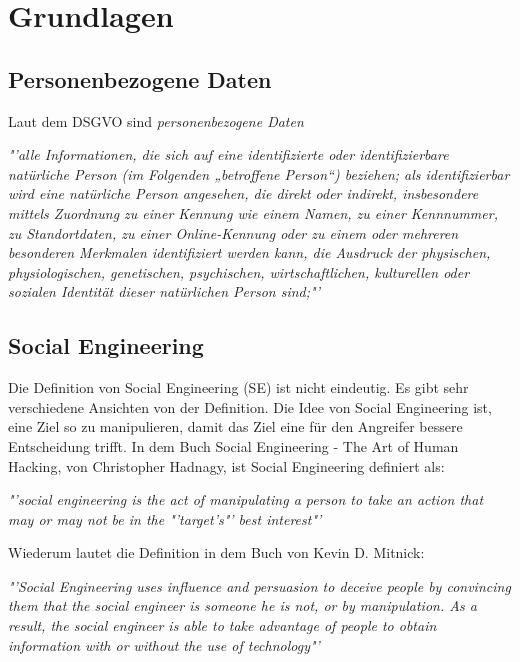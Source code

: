 
\chapter {Grundlagen}  %
\label{cha:grundlagen} %

\section{Personenbezogene Daten}
Laut dem DSGVO sind \textit{personenbezogene Daten} 

\textit{"'alle Informationen, die sich auf eine identifizierte oder identifizierbare natürliche Person (im Folgenden „betroffene Person“) beziehen; als identifizierbar wird eine natürliche Person angesehen, die direkt oder indirekt, insbesondere mittels Zuordnung zu einer Kennung wie einem Namen, zu einer Kennnummer, zu Standortdaten, zu einer Online-Kennung oder zu einem oder mehreren besonderen Merkmalen identifiziert werden kann, die Ausdruck der physischen, physiologischen, genetischen, psychischen, wirtschaftlichen, kulturellen oder sozialen Identität dieser natürlichen Person sind;"'}\cite{personenbezogeneDaten}

\section{Social Engineering} %
\label {sec:Social Engineering} %
	Die Definition von Social Engineering (SE) ist nicht eindeutig. Es gibt sehr verschiedene Ansichten von der Definition. Die Idee von Social Engineering ist, eine Ziel so zu manipulieren, damit das Ziel eine für den Angreifer bessere Entscheidung trifft. In dem Buch Social Engineering - The Art of Human Hacking, von Christopher Hadnagy, ist Social Engineering definiert als:
	
	\textit{"'social engineering is the act of manipulating a person to take an action that may or may not be in the "'target’s"' best interest"'}\cite{ArtOfHumanHacking}
	
	Wiederum lautet die Definition in dem Buch von Kevin D. Mitnick:
	
	\textit{"'Social Engineering uses influence and persuasion to deceive people by convincing them that the social engineer is someone he is not, or by manipulation. As a result, the social engineer is able to take advantage of people to obtain information with or without the use of technology"'}\cite{ArtOfDeception}
	
